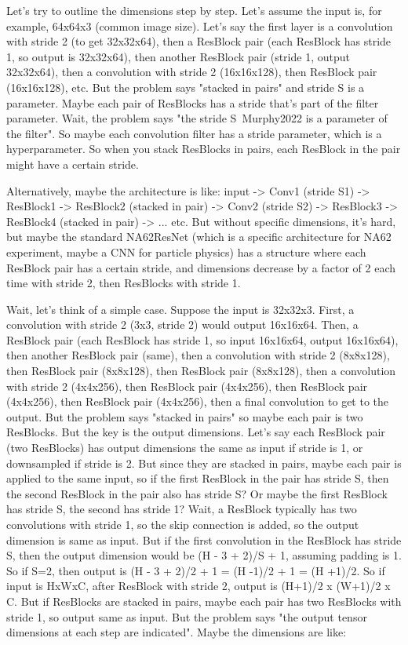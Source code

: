 Let's try to outline the dimensions step by step. Let's assume the input is, for example, 64x64x3 (common image size). Let's say the first layer is a convolution with stride 2 (to get 32x32x64), then a ResBlock pair (each ResBlock has stride 1, so output is 32x32x64), then another ResBlock pair (stride 1, output 32x32x64), then a convolution with stride 2 (16x16x128), then ResBlock pair (16x16x128), etc. But the problem says "stacked in pairs" and stride S is a parameter. Maybe each pair of ResBlocks has a stride that's part of the filter parameter. Wait, the problem says "the stride S~Murphy2022 is a parameter of the filter". So maybe each convolution filter has a stride parameter, which is a hyperparameter. So when you stack ResBlocks in pairs, each ResBlock in the pair might have a certain stride.

Alternatively, maybe the architecture is like: input -> Conv1 (stride S1) -> ResBlock1 -> ResBlock2 (stacked in pair) -> Conv2 (stride S2) -> ResBlock3 -> ResBlock4 (stacked in pair) -> ... etc. But without specific dimensions, it's hard, but maybe the standard NA62ResNet (which is a specific architecture for NA62 experiment, maybe a CNN for particle physics) has a structure where each ResBlock pair has a certain stride, and dimensions decrease by a factor of 2 each time with stride 2, then ResBlocks with stride 1.

Wait, let's think of a simple case. Suppose the input is 32x32x3. First, a convolution with stride 2 (3x3, stride 2) would output 16x16x64. Then, a ResBlock pair (each ResBlock has stride 1, so input 16x16x64, output 16x16x64), then another ResBlock pair (same), then a convolution with stride 2 (8x8x128), then ResBlock pair (8x8x128), then ResBlock pair (8x8x128), then a convolution with stride 2 (4x4x256), then ResBlock pair (4x4x256), then ResBlock pair (4x4x256), then ResBlock pair (4x4x256), then a final convolution to get to the output. But the problem says "stacked in pairs" so maybe each pair is two ResBlocks. But the key is the output dimensions. Let's say each ResBlock pair (two ResBlocks) has output dimensions the same as input if stride is 1, or downsampled if stride is 2. But since they are stacked in pairs, maybe each pair is applied to the same input, so if the first ResBlock in the pair has stride S, then the second ResBlock in the pair also has stride S? Or maybe the first ResBlock has stride S, the second has stride 1? Wait, a ResBlock typically has two convolutions with stride 1, so the skip connection is added, so the output dimension is same as input. But if the first convolution in the ResBlock has stride S, then the output dimension would be (H - 3 + 2)/S + 1, assuming padding is 1. So if S=2, then output is (H - 3 + 2)/2 + 1 = (H -1)/2 + 1 = (H +1)/2. So if input is HxWxC, after ResBlock with stride 2, output is (H+1)/2 x (W+1)/2 x C. But if ResBlocks are stacked in pairs, maybe each pair has two ResBlocks with stride 1, so output same as input. But the problem says "the output tensor dimensions at each step are indicated". Maybe the dimensions are like:

